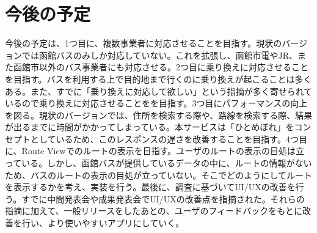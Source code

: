 \chapter{今後の予定}
今後の予定は、1つ目に、複数事業者に対応させることを目指す。現状のバージョンでは函館バスのみしか対応していない。これを拡張し、函館市電やJR、また函館市以外のバス事業者にも対応させる。2つ目に乗り換えに対応させることを目指す。バスを利用する上で目的地まで行くのに乗り換えが起こることは多くある。また、すでに「乗り換えに対応して欲しい」という指摘が多く寄せられているので乗り換えに対応させることをを目指す。3つ目にパフォーマンスの向上を図る。現状のバージョンでは、住所を検索する際や、路線を検索する際、結果が出るまでに時間がかかってしまっている。本サービスは「ひとめぼれ」をコンセプトとしているため、このレスポンスの遅さを改善することを目指す。4つ目に、Route Viewでのルートの表示を目指す。ユーザのルートの表示の目処は立っている。しかし、函館バスが提供しているデータの中に、ルートの情報がないため、バスのルートの表示の目処が立っていない。そこでどのようにしてルートを表示するかを考え、実装を行う。最後に、調査に基づいてUI/UXの改善を行う。すでに中間発表会や成果発表会でUI/UXの改善点を指摘された。それらの指摘に加えて、一般リリースをしたあとの、ユーザのフィードバックをもとに改善を行い、より使いやすいアプリにしていく。
